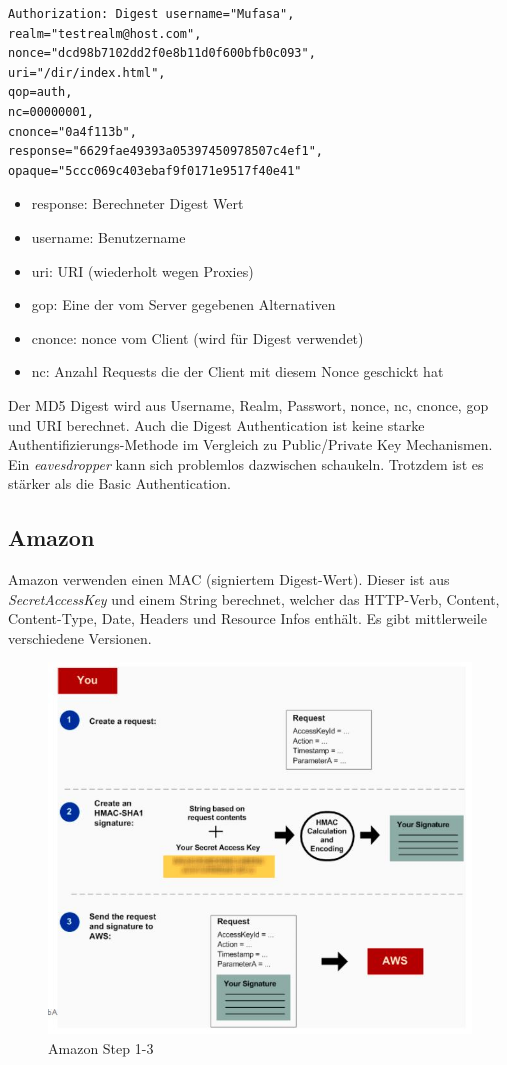 \begin{lstlisting}[caption=HTTP Request Header]
Authorization: Digest username="Mufasa",
realm="testrealm@host.com",
nonce="dcd98b7102dd2f0e8b11d0f600bfb0c093",
uri="/dir/index.html",
qop=auth,
nc=00000001,
cnonce="0a4f113b",
response="6629fae49393a05397450978507c4ef1",
opaque="5ccc069c403ebaf9f0171e9517f40e41"
\end{lstlisting}

\begin{itemize}
	\item response: Berechneter Digest Wert
	\item username: Benutzername
	\item uri: URI (wiederholt wegen Proxies)
	\item gop: Eine der vom Server gegebenen Alternativen
	\item cnonce: nonce vom Client (wird für Digest verwendet)
	\item nc: Anzahl Requests die der Client mit diesem Nonce
	geschickt hat
\end{itemize}

Der MD5 Digest wird aus Username, Realm, Passwort, nonce, nc, cnonce, gop und URI berechnet. Auch die Digest Authentication ist keine starke Authentifizierungs-Methode im Vergleich zu Public/Private Key Mechanismen. Ein \textit{eavesdropper} kann sich problemlos dazwischen schaukeln. Trotzdem ist es stärker als die Basic Authentication. 

\newpage
\subsection{Amazon}

Amazon verwenden einen MAC (signiertem Digest-Wert). Dieser ist aus \textit{SecretAccessKey} und einem String berechnet, welcher das HTTP-Verb, Content, Content-Type, Date, Headers und Resource Infos enthält. Es gibt mittlerweile verschiedene Versionen.

\begin{figure}[h!]
\centering
\includegraphics[width=0.6\linewidth]{fig/amazon-steps-1-3}
\caption{Amazon Step 1-3}
\label{fig:amazon-steps-1-3}
\end{figure}

